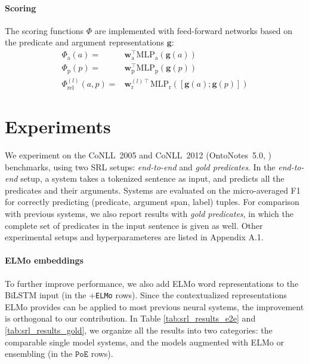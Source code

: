 \documentclass[11pt,a4paper]{article}
\begin{document}
\paragraph{Scoring}
The scoring functions $\Phi$ are implemented with feed-forward networks based on the predicate and argument representations $\mathbf{g}$:
\begin{align}
     \Phi_{\text{a}} (a) =& \mathbf{w}_{\text{a}}^\intercal \text{MLP}_{\text{a}} (\mathbf{g}(a)) \\
     \Phi_{\text{p}} (p) =& \mathbf{w}_{\text{p}}^\intercal \text{MLP}_{\text{p}} (\mathbf{g}(p)) \\
     \Phi^{(l)}_{\text{rel}} (a, p) =& \mathbf{w}^{(l)\intercal}_{\text{r}} \text{MLP}_{\text{r}} ([\mathbf{g}(a); \mathbf{g}(p)]) 
\end{align}
 \section{Experiments}

We experiment on the CoNLL~2005 \cite{carreras2005introduction} and CoNLL~2012 (OntoNotes~5.0, \cite{Pradhan2013TowardsRL}) benchmarks,
using two SRL setups: \textit{end-to-end} and \textit{gold predicates}. In the \textit{end-to-end} setup, a system takes a tokenized sentence as input, and predicts all the predicates and their arguments. Systems are evaluated on the micro-averaged F1 for correctly predicting (predicate, argument span, label) tuples. For comparison with previous systems, we also report results with \textit{gold predicates}, in which the complete set of predicates in the input sentence is given as well.
Other experimental setups and hyperparameteres are listed in Appendix A.1.

\paragraph{ELMo embeddings} 
To further improve performance, we also add ELMo word representations \cite{peters2018deep} to the BiLSTM input (in the +\texttt{ELMo} rows). Since the contextualized representations ELMo provides can be applied to most previous neural systems, the improvement is orthogonal to our contribution. In Table \ref{tab:srl_results_e2e} and \ref{tab:srl_results_gold}, we organize all the results into two categories: the comparable single model systems, and the models augmented with ELMo or ensembling (in the $\texttt{PoE}$ rows).
\end{document}

